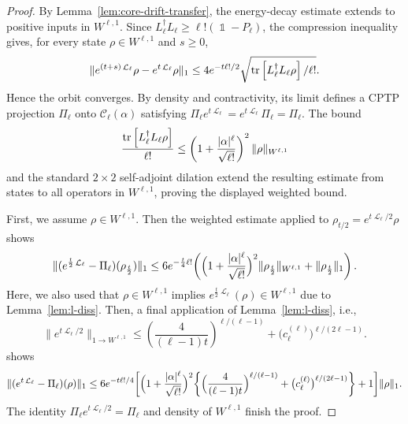 \documentclass[11pt]{article}
\theoremstyle{myplain}
\theoremstyle{mydefinition}
\theoremstyle{remark}
\DeclareMathOperator{\cL}{\mathcal{L}}
\DeclareMathOperator{\1}{\mathds{1}}
\newcommand{\tr}[1][]{\operatorname{tr}%
  \ifx#1\empty \else \left[ #1 \right] \fi}
\begin{document}
        \begin{proof}
            
            By Lemma~\ref{lem:core-drift-transfer}, the energy-decay estimate extends to positive inputs in $W^{\ell,1}$. Since $L_\ell^\dagger L_\ell\geq\ell!(\1-P_\ell)$, the compression inequality gives, for every state $\rho\in W^{\ell,1}$ and $s\geq0$,
            \begin{equation*}
                \|e^{(t+s)\cL_\ell}\rho-e^{t\cL_\ell}\rho\|_1
                \leq4e^{-t\ell!/2}\sqrt{\tr[L_\ell^\dagger L_\ell\rho]/\ell!}.
            \end{equation*}
            Hence the orbit converges. By density and contractivity, its limit defines a CPTP projection $\Pi_\ell$ onto $\mathcal C_\ell(\alpha)$ satisfying $\Pi_\ell e^{t\cL_\ell}=e^{t\cL_\ell}\Pi_\ell=\Pi_\ell$. The bound
            \begin{equation*}
                \frac{\tr[L_\ell^\dagger L_\ell\rho]}{\ell!}
                \leq\left(1+\frac{|\alpha|^\ell}{\sqrt{\ell!}}\right)^2
                \|\rho\|_{W^{\ell,1}}
            \end{equation*}
            and the standard $2\times2$ self-adjoint dilation extend the resulting estimate from states to all operators in $W^{\ell,1}$, proving the displayed weighted bound.
            
            First, we assume $\rho\in W^{\ell,1}$. Then the weighted estimate applied to $\rho_{t/2}=e^{t\cL_\ell/2}\rho$ shows
            \begin{equation*}
                \|(e^{\frac{t}{2}\cL_\ell} - \Pi_\ell)(\rho_{\frac{t}{2}})\|_1\leq 6e^{- \frac{t}{4} \ell!}\biggl( \Bigl(1 + \frac{|\alpha|^\ell}{\sqrt{\ell!}}\Bigr)^2\|\rho_{\frac{t}{2}}\|_{W^{\ell,1}} + \|\rho_{\frac{t}{2}}\|_1 \biggr)\,.
            \end{equation*}
            Here, we also used that $\rho\in W^{\ell,1}$ implies $e^{\frac{t}{2}\cL_\ell}(\rho)\in W^{\ell,1}$ due to Lemma~\ref{lem:l-diss}. Then, a final application of Lemma~\ref{lem:l-diss}, i.e.,
            \begin{equation*}
                \|e^{t\cL_\ell/2}\|_{1\to W^{\ell,1}}
                \leq\left(\frac4{(\ell-1)t}\right)^{\ell/(\ell-1)}
                +\bigl(c_\ell^{(\ell)}\bigr)^{\ell/(2\ell-1)}.
            \end{equation*}
            shows
            \begin{equation*}
                \begin{aligned}
                    \|(e^{t\cL_\ell}-\Pi_\ell)(\rho)\|_1
                    \leq6e^{-t\ell!/4}\biggl[\Bigl(1+\frac{|\alpha|^\ell}{\sqrt{\ell!}}\Bigr)^2
                    \biggl\{\Bigl(\frac4{(\ell-1)t}\Bigr)^{\ell/(\ell-1)}
                    +\bigl(c_\ell^{(\ell)}\bigr)^{\ell/(2\ell-1)}\biggr\}+1\biggr]\|\rho\|_1.
                \end{aligned}
            \end{equation*}
            The identity $\Pi_\ell e^{t\cL_\ell/2}=\Pi_\ell$ and density of $W^{\ell,1}$ finish the proof.
        \end{proof}
\end{document}
